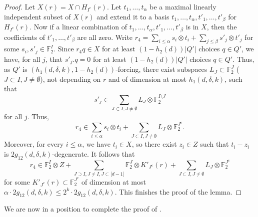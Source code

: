 \documentclass{toc}
\newcommand\F{\mathbb{F}}
\renewcommand\a{\alpha}
\renewcommand\d{\delta}
\newcommand \s{\subset}
\begin{document}
\begin{proof}
  Let $X(r)=X\cap H_{I^c}(r)$. Let $t_1,\dots,t_{\a}$ be a maximal linearly independent subset of $X(r)$ and extend it to a basis $t_1,\dots,t_{\a},t'_1,\dots,t'_{\beta}$ for $H_{I^c}(r)$. Now if a linear combination of $t_1,\dots,t_{\a},t'_1,\dots,t'_{\beta}$ is in $X$, then the coefficients of $t'_1,\dots,t'_{\beta}$ are all zero. Write $r_4=\sum_{i\leq \a}s_i\otimes t_i+\sum_{j\leq \beta}s'_j\otimes t'_j$ for some $s_i,s'_j\in \F_2^{I}$. Since $r_4q\in X$ for at least $(1-h_2(d))|Q'|$ choices $q\in Q'$, we have, for all $j$, that $s'_j.q=0$ for at least $(1-h_2(d))|Q'|$ choices $q\in Q'$. Thus, as $Q'$ is $(h_1(d,\d,k),1-h_2(d))$-forcing, there exist subspaces $L_J\s \F_2^{J}$ ($J\s I,J\neq \emptyset$), not depending on $r$ and of dimension at most $h_1(d,\d,k)$, such that
  \[
    s'_j\in \sum_{J\s I,J\neq \emptyset} L_J\otimes \F_2^{I\setminus J}
  \]
  for all $j$. Thus,
  \[
    r_4\in \sum_{i\leq \a}s_i\otimes t_i+\sum_{J\s I,J\neq \emptyset}
    L_J\otimes \F_2^{J^c}.
  \]
  Moreover, for every $i\leq \a$, we have
  $t_i\in X$, so there exist $z_i\in Z$ such that $t_i-z_i$ is
  $2g_{12}(d,\d,k)$-degenerate. It follows that
  \[
    r_4\in \F_2^{I}\otimes Z+\sum_{J\supset I,J\neq I,J\subset \lbrack
      d-1\rbrack} \F_2^{J}\otimes K'_{J^c}(r)+\sum_{J\s I,J\neq
      \emptyset} L_J\otimes \F_2^{J^c}
  \]
  for some $K'_{J^c}(r)\s \F_2^{J^c}$ of dimension at most
  $\a\cdot 2g_{12}(d,\d,k)\leq 2^k\cdot 2g_{12}(d,\d,k)$. This
  finishes the proof of the lemma.
\end{proof}

We are now in a position to complete the proof of .
\end{document}
